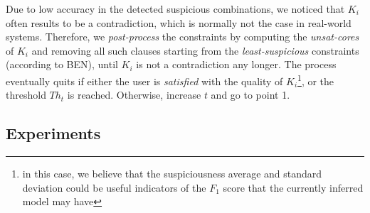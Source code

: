 \begin{tikzborder}{\cite{Gargantini16:validation}}
\begin{tikzborder}{\cite{gargantini_combinatorial_2017}}
\begin{tikzborder}{\cite{gargantini_combinatorial_2017}}
\begin{tikzborder}{\cite{garn2019}}
\begin{inparaenum}
Due to low accuracy in the detected suspicious combinations, 
we noticed that $K_i$ often results to be a contradiction, which is normally not the case in real-world systems.%
Therefore, we \textit{post-process} the constraints by computing the \textit{unsat-cores} of $K_i$ and removing all such clauses starting from the \textit{least-suspicious} constraints (according to BEN), until
$K_i$ is not a contradiction any longer.
The process eventually quits if either the user is \textit{satisfied} with the quality of $K_i$\footnote{in this case, we believe that the suspiciousness average and standard deviation could be useful indicators of the $F_1$ score that the currently inferred model may have}, or the threshold $Th_t$ is reached.
Otherwise, increase $t$ and go to point 1.
\end{inparaenum}
\be

\subsection{Experiments}\label{sec:xssexperiments}


\end{tikzborder}
\end{tikzborder}
\end{tikzborder}
\end{tikzborder}
